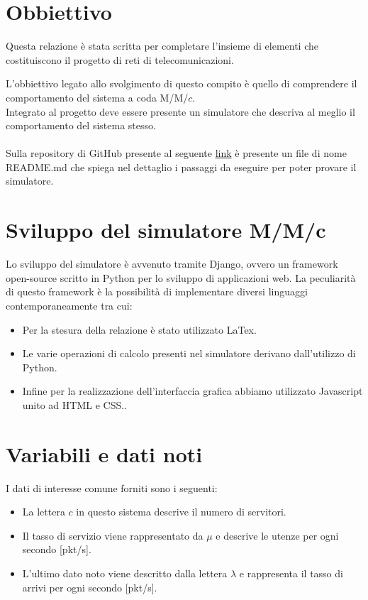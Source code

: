 \documentclass[12pt,a4paper]{article}
\begin{document}
\section{Obbiettivo}

    Questa relazione è stata scritta per completare l'insieme di elementi che costituiscono il progetto di reti di telecomunicazioni.
    
    L'obbiettivo legato allo svolgimento di questo compito è quello di comprendere il comportamento del sistema a coda M/M/$c$. \\ 
    Integrato al progetto deve essere presente un simulatore che descriva al meglio il comportamento del sistema stesso. \\ \\
    Sulla repository di GitHub presente al seguente \href{https://github.com/acuti03/progetto-reti}{link} è presente un file di nome README.md che spiega nel dettaglio i passaggi da eseguire per poter provare il simulatore.
    
\section{Sviluppo del simulatore M/M/c}
    Lo sviluppo del simulatore è avvenuto tramite Django, ovvero un framework open-source scritto in Python per lo sviluppo di applicazioni web. La peculiarità di questo framework è la possibilità di implementare diversi linguaggi contemporaneamente tra cui: 
    \begin{itemize}
        \item  Per la stesura della relazione è stato utilizzato LaTex.
        \item  Le varie operazioni di calcolo presenti nel simulatore derivano dall'utilizzo di Python. 
        \item  Infine per la realizzazione dell'interfaccia grafica abbiamo utilizzato Javascript unito ad HTML e CSS..
    \end{itemize}

\section{Variabili e dati noti}

I dati di interesse comune forniti sono i seguenti:
    
    \begin{itemize}
    \item La lettera $c$ in questo sistema descrive il numero di servitori.
    
    \item Il tasso di servizio viene rappresentato da $\mu$ e descrive le utenze per ogni secondo [pkt/s]. 
    
    \item L'ultimo dato noto viene descritto dalla lettera $\lambda$ e rappresenta il tasso di arrivi per ogni secondo [pkt/s].
    \end{itemize}
\end{document}
